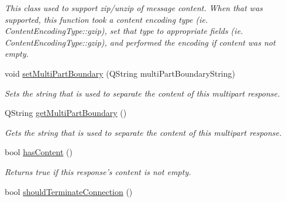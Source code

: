 \begin{DoxyCompactItemize}
\begin{DoxyCompactList}\small\item\em This class used to support zip/unzip of message content. When that was supported, this function took a content encoding type (ie. Content\-Encoding\-Type\-::gzip), set that type to appropriate fields (ie. Content\-Encoding\-Type\-::gzip), and performed the encoding if content was not empty. \end{DoxyCompactList}\item 
void \hyperlink{struct_picto_1_1_protocol_response_ada2645e8c1083fadb3ac396bdc51c504}{set\-Multi\-Part\-Boundary} (Q\-String multi\-Part\-Boundary\-String)
\begin{DoxyCompactList}\small\item\em Sets the string that is used to separate the content of this multipart response. \end{DoxyCompactList}\item 
Q\-String \hyperlink{struct_picto_1_1_protocol_response_a39b1e563150d1da66ae6a57e435eef3b}{get\-Multi\-Part\-Boundary} ()
\begin{DoxyCompactList}\small\item\em Gets the string that is used to separate the content of this multipart response. \end{DoxyCompactList}\item 
\hypertarget{struct_picto_1_1_protocol_response_a9321eae9c54cf3c3ff3c4be52debc842}{bool \hyperlink{struct_picto_1_1_protocol_response_a9321eae9c54cf3c3ff3c4be52debc842}{has\-Content} ()}\label{struct_picto_1_1_protocol_response_a9321eae9c54cf3c3ff3c4be52debc842}

\begin{DoxyCompactList}\small\item\em Returns true if this response's content is not empty. \end{DoxyCompactList}\item 
\hypertarget{struct_picto_1_1_protocol_response_a491cb931b28950121a8b669c8cecc378}{bool \hyperlink{struct_picto_1_1_protocol_response_a491cb931b28950121a8b669c8cecc378}{should\-Terminate\-Connection} ()}\label{struct_picto_1_1_protocol_response_a491cb931b28950121a8b669c8cecc378}


\end{DoxyCompactItemize}
